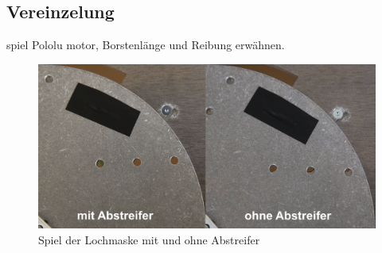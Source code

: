 \subsection{Vereinzelung} \label{sec:Inbetriebnahme_Vereinzelung}
spiel Pololu motor, Borstenlänge und Reibung erwähnen.

\begin{figure}[H]
	\includegraphics[width=1\textwidth]{Illustrationen/7-Inbetriebnahme_und_Kalibration/spiel_lochmaske.jpg}
	\caption{Spiel der Lochmaske mit und ohne Abstreifer}
	\label{fig:spiel_lochmaske}
\end{figure}